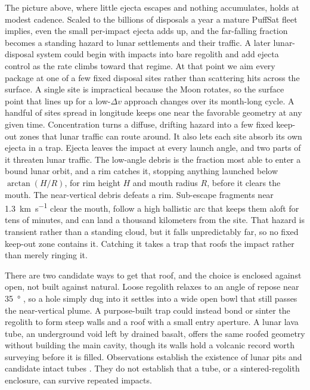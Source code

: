 \documentclass{article}
\newcommand{\deltav}{\Delta v}
\begin{document}
The picture above, where little ejecta escapes and nothing accumulates, holds at modest cadence. Scaled to the billions of disposals a year a mature PuffSat fleet implies, even the small per-impact ejecta adds up, and the far-falling fraction becomes a standing hazard to lunar settlements and their traffic. A later lunar-disposal system could begin with impacts into bare regolith and add ejecta control as the rate climbs toward that regime. At that point we aim every package at one of a few fixed disposal sites rather than scattering hits across the surface. A single site is impractical because the Moon rotates, so the surface point that lines up for a low-$\deltav$ approach changes over its month-long cycle. A handful of sites spread in longitude keeps one near the favorable geometry at any given time. Concentration turns a diffuse, drifting hazard into a few fixed keep-out zones that lunar traffic can route around. It also lets each site absorb its own ejecta in a trap. Ejecta leaves the impact at every launch angle, and two parts of it threaten lunar traffic. The low-angle debris is the fraction most able to enter a bound lunar orbit, and a rim catches it, stopping anything launched below $\arctan(H/R)$, for rim height $H$ and mouth radius $R$, before it clears the mouth. The near-vertical debris defeats a rim. Sub-escape fragments near \SI{1.3}{\kilo\meter\per\second} clear the mouth, follow a high ballistic arc that keeps them aloft for tens of minutes, and can land a thousand kilometers from the site. That hazard is transient rather than a standing cloud, but it falls unpredictably far, so no fixed keep-out zone contains it. Catching it takes a trap that roofs the impact rather than merely ringing it.

There are two candidate ways to get that roof, and the choice is enclosed against open, not built against natural. Loose regolith relaxes to an angle of repose near \SI{35}{\degree} \cite{mckay1991lunar}, so a hole simply dug into it settles into a wide open bowl that still passes the near-vertical plume. A purpose-built trap could instead bond or sinter the regolith to form steep walls and a roof with a small entry aperture. A lunar lava tube, an underground void left by drained basalt, offers the same roofed geometry without building the main cavity, though its walls hold a volcanic record worth surveying before it is filled. Observations establish the existence of lunar pits and candidate intact tubes \cite{wagner2014pits,kaku2017lavatubes}. They do not establish that a tube, or a sintered-regolith enclosure, can survive repeated impacts.
\end{document}
